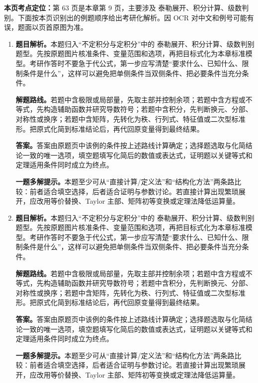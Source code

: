 \begin{solutionblock}
\textbf{本页考点定位：}第 63 页是本章第 9 页，主要涉及 泰勒展开、积分计算、级数判别。下面按本页识别出的例题顺序给出考研化解析。因 OCR 对中文和例号可能有误，题面以页首原图为准。

\begin{enumerate}[label=\textbf{例\arabic*.}, leftmargin=2.4em]

\item \textbf{题目解析。}本题归入“不定积分与定积分”中的 泰勒展开、积分计算、级数判别 题型。先按原题图片核准条件、变量范围和选项，再把目标式化为本章标准模型。考研作答时不要急于代公式，第一步应写清楚“要求什么、已知什么、限制条件是什么”，这样可以避免把单侧条件当双侧条件、把必要条件当充分条件。

\textbf{解题路线。}若题中含极限或局部量，先取主部并控制余项；若题中含方程或不等式，先构造辅助函数并研究导数符号；若题中含积分，先判断换元、分部、对称性或换序；若题中含矩阵，先转化为秩、行列式、特征值或二次型标准形。把原式化简到标准结论后，再代回原变量得到最终结果。

\textbf{答案。}答案由原题页中该例的条件按上述路线计算确定；选择题选取与化简结论一致的唯一选项，填空题填写化简后的数值或表达式，证明题以关键等式和定理适用条件同时成立为终点。

\textbf{一题多解提示。}本题至少可从“直接计算/定义法”和“结构化方法”两条路比较：前者适合填空选择，后者适合证明与参数讨论。若直接计算出现繁琐展开，应改用等价替换、Taylor 主部、矩阵初等变换或定理法降低运算量。

\item \textbf{题目解析。}本题归入“不定积分与定积分”中的 泰勒展开、积分计算、级数判别 题型。先按原题图片核准条件、变量范围和选项，再把目标式化为本章标准模型。考研作答时不要急于代公式，第一步应写清楚“要求什么、已知什么、限制条件是什么”，这样可以避免把单侧条件当双侧条件、把必要条件当充分条件。

\textbf{解题路线。}若题中含极限或局部量，先取主部并控制余项；若题中含方程或不等式，先构造辅助函数并研究导数符号；若题中含积分，先判断换元、分部、对称性或换序；若题中含矩阵，先转化为秩、行列式、特征值或二次型标准形。把原式化简到标准结论后，再代回原变量得到最终结果。

\textbf{答案。}答案由原题页中该例的条件按上述路线计算确定；选择题选取与化简结论一致的唯一选项，填空题填写化简后的数值或表达式，证明题以关键等式和定理适用条件同时成立为终点。

\textbf{一题多解提示。}本题至少可从“直接计算/定义法”和“结构化方法”两条路比较：前者适合填空选择，后者适合证明与参数讨论。若直接计算出现繁琐展开，应改用等价替换、Taylor 主部、矩阵初等变换或定理法降低运算量。


\end{enumerate}
\end{solutionblock}
